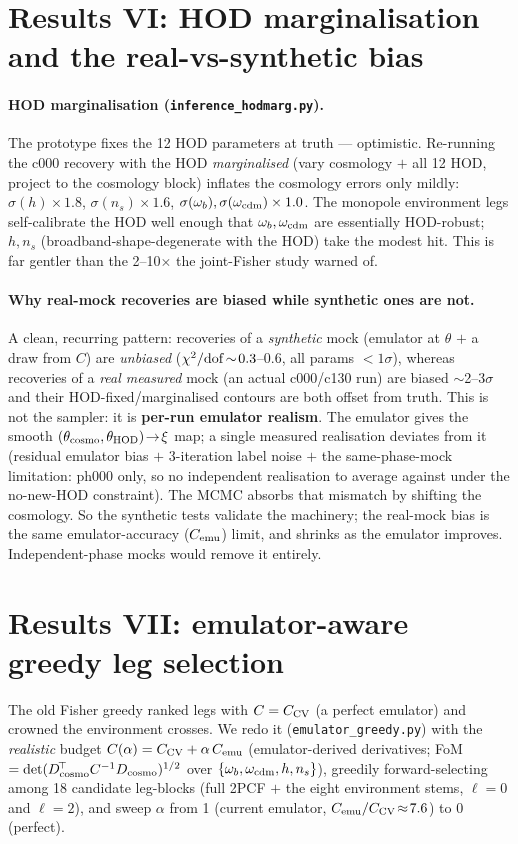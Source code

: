 \documentclass[11pt]{article}
\newcommand{\code}[1]{\texttt{#1}}
\begin{document}
\section{Results VI: HOD marginalisation and the real-vs-synthetic bias}
\paragraph{HOD marginalisation (\code{inference\_hodmarg.py}).} The prototype fixes
the 12 HOD parameters at truth --- optimistic. Re-running the c000 recovery with the
HOD \emph{marginalised} (vary cosmology $+$ all 12 HOD, project to the cosmology block)
inflates the cosmology errors only mildly: $\sigma(h)\times1.8$, $\sigma(n_s)\times1.6$,
$\sigma(\omega_b),\sigma(\omega_{\rm cdm})\times1.0$. The monopole environment legs
self-calibrate the HOD well enough that $\omega_b,\omega_{\rm cdm}$ are essentially
HOD-robust; $h,n_s$ (broadband-shape-degenerate with the HOD) take the modest hit.
This is far gentler than the 2--10$\times$ the joint-Fisher study warned of.

\paragraph{Why real-mock recoveries are biased while synthetic ones are not.} A clean,
recurring pattern: recoveries of a \emph{synthetic} mock (emulator at $\theta$ $+$ a
draw from $C$) are \emph{unbiased} ($\chi^2/{\rm dof}\!\sim\!0.3$--0.6, all params
$<1\sigma$), whereas recoveries of a \emph{real measured} mock (an actual c000/c130
run) are biased $\sim$2--3$\sigma$ and their HOD-fixed/marginalised contours are both
offset from truth. This is not the sampler: it is \textbf{per-run emulator realism}.
The emulator gives the smooth $(\theta_{\rm cosmo},\theta_{\rm HOD})\!\to\!\xi$ map; a
single measured realisation deviates from it (residual emulator bias $+$ 3-iteration
label noise $+$ the same-phase-mock limitation: ph000 only, so no independent
realisation to average against under the no-new-HOD constraint). The MCMC absorbs that
mismatch by shifting the cosmology. So the synthetic tests validate the machinery; the
real-mock bias is the same emulator-accuracy ($C_{\rm emu}$) limit, and shrinks as the
emulator improves. Independent-phase mocks would remove it entirely.

\section{Results VII: emulator-aware greedy leg selection}
The old Fisher greedy ranked legs with $C=C_{\rm CV}$ (a perfect emulator) and crowned
the environment crosses. We redo it (\code{emulator\_greedy.py}) with the \emph{realistic}
budget $C(\alpha)=C_{\rm CV}+\alpha\,C_{\rm emu}$ (emulator-derived derivatives;
FoM$=\det(D_{\rm cosmo}^{\!\top}C^{-1}D_{\rm cosmo})^{1/2}$ over
$\{\omega_b,\omega_{\rm cdm},h,n_s\}$), greedily forward-selecting among 18 candidate
leg-blocks (full 2PCF $+$ the eight environment stems, $\ell=0$ and $\ell=2$), and sweep
$\alpha$ from 1 (current emulator, $C_{\rm emu}/C_{\rm CV}\!\approx\!7.6$) to 0 (perfect).
\end{document}
